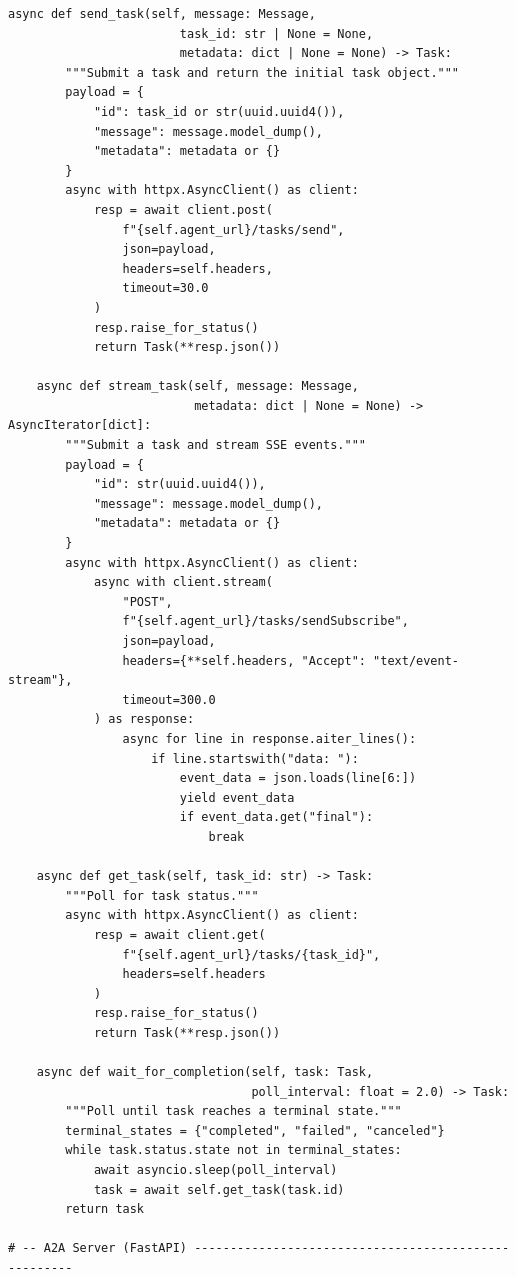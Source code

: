 \begin{lstlisting}[style=pythonstyle]
    async def send_task(self, message: Message,
                        task_id: str | None = None,
                        metadata: dict | None = None) -> Task:
        """Submit a task and return the initial task object."""
        payload = {
            "id": task_id or str(uuid.uuid4()),
            "message": message.model_dump(),
            "metadata": metadata or {}
        }
        async with httpx.AsyncClient() as client:
            resp = await client.post(
                f"{self.agent_url}/tasks/send",
                json=payload,
                headers=self.headers,
                timeout=30.0
            )
            resp.raise_for_status()
            return Task(**resp.json())

    async def stream_task(self, message: Message,
                          metadata: dict | None = None) -> AsyncIterator[dict]:
        """Submit a task and stream SSE events."""
        payload = {
            "id": str(uuid.uuid4()),
            "message": message.model_dump(),
            "metadata": metadata or {}
        }
        async with httpx.AsyncClient() as client:
            async with client.stream(
                "POST",
                f"{self.agent_url}/tasks/sendSubscribe",
                json=payload,
                headers={**self.headers, "Accept": "text/event-stream"},
                timeout=300.0
            ) as response:
                async for line in response.aiter_lines():
                    if line.startswith("data: "):
                        event_data = json.loads(line[6:])
                        yield event_data
                        if event_data.get("final"):
                            break

    async def get_task(self, task_id: str) -> Task:
        """Poll for task status."""
        async with httpx.AsyncClient() as client:
            resp = await client.get(
                f"{self.agent_url}/tasks/{task_id}",
                headers=self.headers
            )
            resp.raise_for_status()
            return Task(**resp.json())

    async def wait_for_completion(self, task: Task,
                                  poll_interval: float = 2.0) -> Task:
        """Poll until task reaches a terminal state."""
        terminal_states = {"completed", "failed", "canceled"}
        while task.status.state not in terminal_states:
            await asyncio.sleep(poll_interval)
            task = await self.get_task(task.id)
        return task

# -- A2A Server (FastAPI) -----------------------------------------------------


\end{lstlisting}
